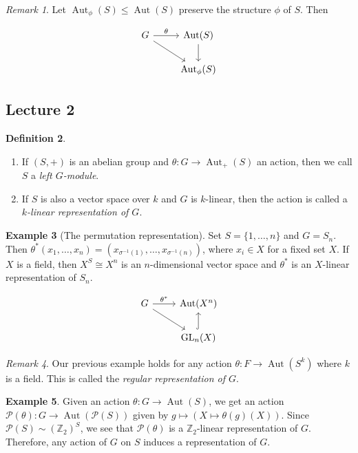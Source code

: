 \documentclass[10pt,letterpaper,cm]{nupset}
\theoremstyle{definition}
\newtheorem{definition}{Definition}[subsection]
\newtheorem{exmp}[definition]{Example}
\theoremstyle{theorem}
\theoremstyle{remark}
\newtheorem{remark}[definition]{Remark}
\renewcommand{\P}{\mathcal P}
\newcommand{\Z}{\mathbb Z}
\newcommand{\1}{\mathbf{1}}
\newcommand{\0}{\vec 0}
\DeclareMathOperator*{\GL}{GL}
\DeclareMathOperator{\aut}{Aut}
\begin{document}
\begin{remark} Let $\aut_\phi(S) \leq \aut(S)$ preserve the structure $\phi$ of $S$. Then 

\[ \begin{tikzcd}
G \arrow{r}{\theta} \arrow[swap]{dr} & \aut(S) \arrow{d} \\%
 & \aut_\phi(S)
\end{tikzcd}
\]

\end{remark}

\subsection{Lecture 2}


\begin{definition}  $ $
\begin{enumerate}
\item If $(S, +)$ is an abelian group and $\theta : G \to \aut_+(S)$ an action, then we call $S$ a \textit{left $G$-module}.
\item If $S$ is also a vector space over $k$ and $G$ is $k$-linear, then the action is called a \textit{$k$-linear representation of $G$}.
\end{enumerate}
\end{definition}

\begin{exmp}[The permutation representation]
Set $S = \{1, \ldots, n\}$ and $G = S_n$. Then $\theta^{\ast}(x_1, \ldots, x_n) = (x_{\sigma^{-1}(1)}, \ldots, x_{\sigma^{-1}(n)})$, where $x_i \in X$ for a fixed set $X$. If $X$ is a field, then $X^S \cong X^n$ is an $n$-dimensional vector space and $\theta^\ast$ is an $X$-linear representation of $S_n$.

\[ \begin{tikzcd}
G \arrow{r}{\theta^{\ast}} \arrow[swap]{dr} & \aut(X^n) \\%
 & \GL_n(X) \arrow[hookrightarrow]{u}
\end{tikzcd}
\]

\end{exmp}

\begin{remark}
Our previous example holds for any action $\theta: F \to \aut(S^k)$ where $k$ is a field. This is called the \textit{regular representation of $G$}.
\end{remark}

\begin{exmp}
Given an action $\theta: G \to \aut(S)$, we get an action $\P(\theta): G \to \aut(\P(S))$ given by $g \mapsto (X \mapsto \theta(g)(X))$. Since $\P(S) \sim (\Z_2)^S$, we see that $\P(\theta)$  is a $\Z_2$-linear representation of $G$. Therefore, any action of $G$ on $S$ induces a representation of $G$.
\end{exmp}
\end{document}

